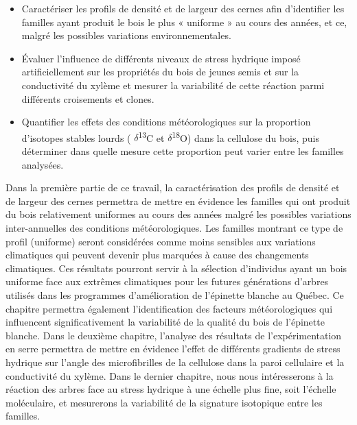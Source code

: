 \documentclass{report}
\newcommand{\Ctreize}{$\delta$\textsuperscript{13}C\xspace}
\newcommand{\Odixhuit}{$\delta$\textsuperscript{18}O\xspace}
\begin{document}
\begin{itemize} 
	
	\item Caractériser les profils de densité et de largeur des cernes afin d'identifier les familles ayant produit le bois le plus « uniforme » au cours des années, et ce, malgré les possibles variations environnementales. 
	
	\item Évaluer l'influence de différents niveaux de stress hydrique imposé artificiellement sur les propriétés du bois de jeunes semis et sur la conductivité du xylème et mesurer la variabilité de cette réaction parmi différents croisements et clones. 	
	
	\item Quantifier les effets des conditions météorologiques sur la proportion d'isotopes stables lourds ( \Ctreize et \Odixhuit) dans la cellulose du bois, puis déterminer dans quelle mesure cette proportion peut varier entre les familles analysées.
	

	
\end{itemize}

   
Dans la première partie de ce travail, la caractérisation des profils de densité et de largeur des cernes permettra de mettre en évidence les familles qui ont produit du bois relativement \og uniformes \fg au cours des années malgré les possibles variations inter-annuelles des conditions météorologiques. Les familles montrant ce type de profil (uniforme) seront considérées comme moins sensibles aux variations climatiques qui peuvent devenir plus marquées à cause des changements climatiques. Ces résultats pourront servir à la sélection d'individus ayant un bois uniforme face aux extrêmes climatiques pour les futures générations d'arbres utilisés dans les programmes d'amélioration de l'épinette blanche au Québec. Ce chapitre permettra également l'identification des facteurs météorologiques qui influencent significativement la variabilité de la qualité du bois de l'épinette blanche. Dans le deuxième chapitre, l'analyse des résultats de l'expérimentation en serre permettra de mettre en évidence l'effet de différents gradients de stress hydrique sur l'angle des microfibrilles de la cellulose dans la paroi cellulaire et la conductivité du xylème. Dans le dernier chapitre, nous nous intéresserons à la réaction des arbres face au stress hydrique à une échelle plus fine, soit l'échelle moléculaire, et mesurerons la variabilité de la signature isotopique entre les familles. \\
\end{document}
